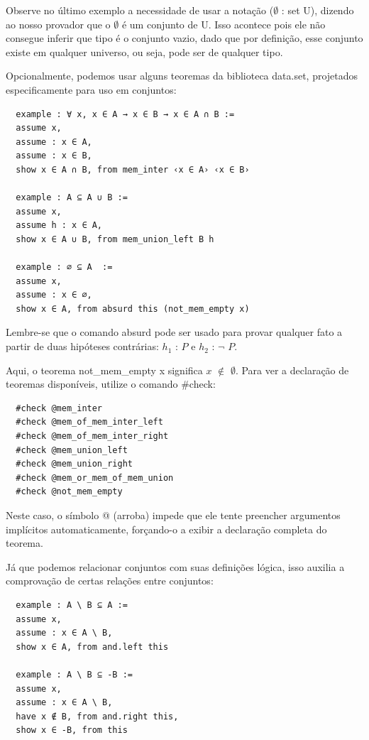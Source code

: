   Observe no último exemplo a necessidade de usar a notação { \selectfont ($\emptyset$ : set U)}, dizendo ao nosso provador que o $\emptyset$ é um conjunto de{
  \selectfont U}. Isso acontece pois ele não consegue inferir que tipo é o conjunto vazio, dado que por definição, esse conjunto existe em qualquer universo, ou seja, pode ser de qualquer tipo.

  Opcionalmente, podemos usar alguns teoremas da biblioteca {
  \selectfont data.set}, projetados especificamente para uso em conjuntos:

  \begin{lstlisting}
  example : ∀ x, x ∈ A → x ∈ B → x ∈ A ∩ B :=
  assume x,
  assume : x ∈ A,
  assume : x ∈ B,
  show x ∈ A ∩ B, from mem_inter ‹x ∈ A› ‹x ∈ B›

  example : A ⊆ A ∪ B :=
  assume x,
  assume h : x ∈ A,
  show x ∈ A ∪ B, from mem_union_left B h

  example : ∅ ⊆ A  :=
  assume x,
  assume : x ∈ ∅,
  show x ∈ A, from absurd this (not_mem_empty x) \end{lstlisting}

  Lembre-se que o comando{
  \selectfont absurd} pode ser usado para provar qualquer fato a partir de duas hipóteses contrárias: $h_1$ : $P$ e $h_2$ : $\neg$ $P$.

  Aqui, o teorema {
  \selectfont not\_mem\_empty x} significa $x$ $\notin$ $\emptyset$. Para ver a declaração de teoremas disponíveis, utilize o comando{
  \selectfont \#check}:
  \begin{lstlisting}
  #check @mem_inter
  #check @mem_of_mem_inter_left
  #check @mem_of_mem_inter_right
  #check @mem_union_left
  #check @mem_union_right
  #check @mem_or_mem_of_mem_union
  #check @not_mem_empty \end{lstlisting}

  Neste caso, o símbolo{
  \selectfont @} (arroba) impede que ele tente preencher argumentos implícitos automaticamente, forçando-o a exibir a declaração completa do teorema.

  Já que podemos relacionar conjuntos com suas definições lógica, isso auxilia a comprovação de certas relações entre conjuntos:

  \begin{lstlisting}
  example : A \ B ⊆ A :=
  assume x,
  assume : x ∈ A \ B,
  show x ∈ A, from and.left this

  example : A \ B ⊆ -B :=
  assume x,
  assume : x ∈ A \ B,
  have x ∉ B, from and.right this,
  show x ∈ -B, from this \end{lstlisting}

